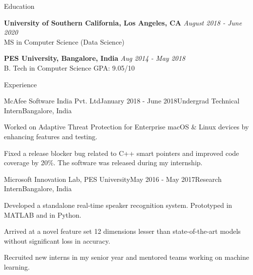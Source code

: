\documentclass{resume} %
\begin{document}

\begin{rSection}{Education}

{\bf University of Southern California, Los Angeles, CA} \hfill {\em August 2018 - June 2020} 
\\ MS in Computer Science (Data Science) \hfill { }  

{\bf PES University, Bangalore, India} \hfill {\em Aug 2014 - May 2018} 
\\ B. Tech in Computer Science \hfill {GPA: 9.05/10 }  



\end{rSection}


\begin{rSection}{Experience}

\begin{rSubsection}{McAfee Software India Pvt. Ltd}{January 2018 - June 2018}{Undergrad Technical Intern}{Bangalore, India}
\item Worked on Adaptive Threat Protection for Enterprise macOS \& Linux devices by enhancing features and testing.
\item Fixed a release blocker bug related to C++ smart pointers and improved code coverage by 20\%. The software was released during my internship.
\end{rSubsection}


\begin{rSubsection}{Microsoft Innovation Lab, PES University}{May 2016 - May 2017}{Research Intern}{Bangalore, India}
\item Developed a standalone real-time speaker recognition system. Prototyped in MATLAB and  in Python. 
\item Arrived at a novel feature set 12 dimensions lesser than state-of-the-art models without significant loss in accuracy.
\item Recruited new interns in my senior year and mentored teams working on machine learning.
\end{rSubsection}

\end{rSection}
\end{document}
